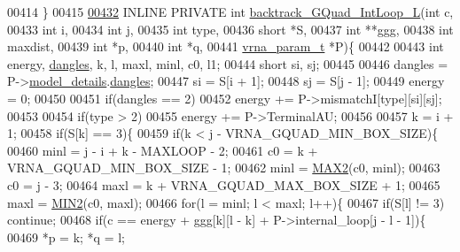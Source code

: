 \begin{DoxyCode}
00414 \}
00415 
\hypertarget{gquad_8h_source.tex_l00432}{}\hyperlink{group__loops_ga7b371308fa5a45c7ac353ef6ed1014de}{00432} INLINE  PRIVATE \textcolor{keywordtype}{int} \hyperlink{group__loops_ga7b371308fa5a45c7ac353ef6ed1014de}{backtrack\_GQuad\_IntLoop\_L}(\textcolor{keywordtype}{int} c,
00433                                               \textcolor{keywordtype}{int} i,
00434                                               \textcolor{keywordtype}{int} j,
00435                                               \textcolor{keywordtype}{int} type,
00436                                               \textcolor{keywordtype}{short} *S,
00437                                               \textcolor{keywordtype}{int} **ggg,
00438                                               \textcolor{keywordtype}{int} maxdist,
00439                                               \textcolor{keywordtype}{int} *p,
00440                                               \textcolor{keywordtype}{int} *q,
00441                                               \hyperlink{group__energy__parameters_structvrna__param__s}{vrna\_param\_t} *P)\{
00442 
00443   \textcolor{keywordtype}{int} energy, \hyperlink{group__model__details_ga72b511ed1201f7e23ec437e468790d74}{dangles}, k, l, maxl, minl, c0, l1;
00444   \textcolor{keywordtype}{short} si, sj;
00445 
00446   dangles = P->\hyperlink{group__energy__parameters_a7b84353eb9075c595bad4ceb871bcae7}{model\_details}.\hyperlink{group__model__details_adcda4ff2ea77748ae0e8700288282efc}{dangles};
00447   si      = S[i + 1];
00448   sj      = S[j - 1];
00449   energy  = 0;
00450 
00451   \textcolor{keywordflow}{if}(dangles == 2)
00452     energy += P->mismatchI[type][si][sj];
00453 
00454   \textcolor{keywordflow}{if}(type > 2)
00455     energy += P->TerminalAU;
00456 
00457   k = i + 1;
00458   \textcolor{keywordflow}{if}(S[k] == 3)\{
00459     \textcolor{keywordflow}{if}(k < j - VRNA\_GQUAD\_MIN\_BOX\_SIZE)\{
00460       minl  = j - i + k - MAXLOOP - 2;
00461       c0    = k + VRNA\_GQUAD\_MIN\_BOX\_SIZE - 1;
00462       minl  = \hyperlink{group__utils_gadd91367918fadbc8d585940d6206d6d2}{MAX2}(c0, minl);
00463       c0    = j - 3;
00464       maxl  = k + VRNA\_GQUAD\_MAX\_BOX\_SIZE + 1;
00465       maxl  = \hyperlink{group__utils_ga2dd4a927a7f937f43a90c144d79107d8}{MIN2}(c0, maxl);
00466       \textcolor{keywordflow}{for}(l = minl; l < maxl; l++)\{
00467         \textcolor{keywordflow}{if}(S[l] != 3) \textcolor{keywordflow}{continue};
00468         \textcolor{keywordflow}{if}(c == energy + ggg[k][l - k] + P->internal\_loop[j - l - 1])\{
00469           *p = k; *q = l;

\end{DoxyCode}
